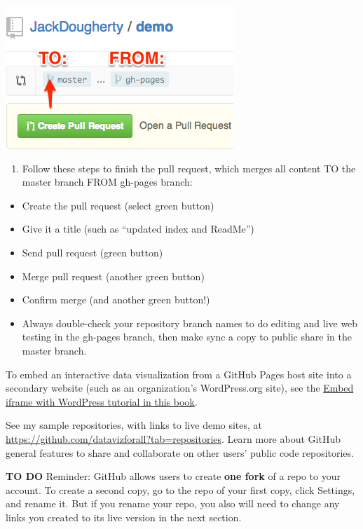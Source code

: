 \documentclass[
  english,
]{book}
\providecommand{\tightlist}{%
  \setlength{\itemsep}{0pt}\setlength{\parskip}{0pt}}
\begin{document}
\includegraphics{images/08-github/GitHub-ToFrom.png}

\begin{enumerate}
\def\labelenumi{\arabic{enumi})}
\setcounter{enumi}{13}
\tightlist
\item
  Follow these steps to finish the pull request, which merges all content TO the master branch FROM gh-pages branch:
\end{enumerate}

\begin{itemize}
\tightlist
\item
  Create the pull request (select green button)
\item
  Give it a title (such as ``updated index and ReadMe'')
\item
  Send pull request (green button)
\item
  Merge pull request (another green button)
\item
  Confirm merge (and another green button!)
\item
  Always double-check your repository branch names to do editing and live web testing in the gh-pages branch, then make sync a copy to public share in the master branch.
\end{itemize}

To embed an interactive data visualization from a GitHub Pages host site into a secondary website (such as an organization's WordPress.org site), see the \href{iframe-wordpress}{Embed iframe with WordPress tutorial in this book}.

See my sample repositories, with links to live demo sites, at \url{https://github.com/datavizforall?tab=repositories}. Learn more about GitHub general features to share and collaborate on other users' public code repositories.

\textbf{TO DO}
Reminder: GitHub allows users to create \textbf{one fork} of a repo to your account. To create a second copy, go to the repo of your first copy, click Settings, and rename it. But if you rename your repo, you also will need to change any links you created to its live version in the next section.
\end{document}
